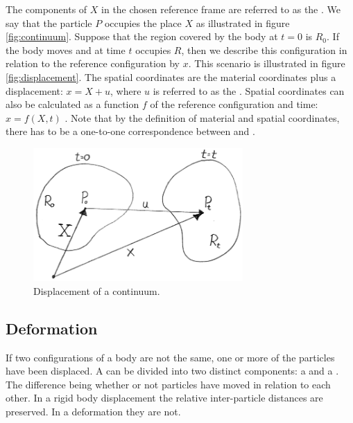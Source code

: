 
The components of $X$ in the chosen reference frame are referred to as
the . We say that the particle $P$ occupies
the place $X$ as illustrated in figure \vref{fig:continuum}. Suppose
that the region covered by the body at
 $t=0$ is $R_0$. If the body moves and at
time $t$ occupies $R$, then we describe this configuration in
relation to the reference configuration by 
$x$. 
This scenario is illustrated in figure \vref{fig:displacement}.
The spatial coordinates are the material coordinates plus a
displacement: $x = X + u$, where $u$ is referred to as the
.
Spatial coordinates can also be calculated as a function $f$ of the
reference configuration and time: $x = f(X,t)$ 
.
Note that by the definition of material and spatial coordinates,
there has to be a one-to-one correspondence between  and .

\begin{figure}
  \centering
  \includegraphics[width=8cm]{./images/physics_displacement.png}
\caption{Displacement of a continuum.}
\label{fig:displacement}
\end{figure}


\subsection{Deformation}
\label{sec:deformation}
If two configurations of a body are not the same,
one or more of the particles have been displaced. A
 can be divided into two distinct components: a
 and a .
%
The difference being whether or not particles have moved in
relation to each other. In a rigid body displacement the relative
inter-particle distances are preserved. In a deformation they are not.

